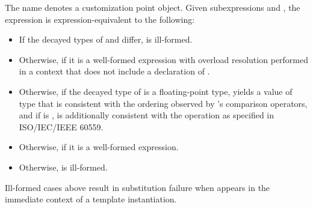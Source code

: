 %
\pnum
The name  denotes
a customization point object.
Given subexpressions  and ,
the expression 
is expression-equivalent to the following:
\begin{itemize}
\item
  If the decayed types of  and  differ,
   is ill-formed.
\item
  Otherwise, 
  if it is a well-formed expression
  with overload resolution performed in a context
  that does not include a declaration of .
\item
  Otherwise, if the decayed type  of  is
  a floating-point type,
  yields a value of type 
  that is consistent with the ordering
  observed by 's comparison operators, and
  if  is ,
  is additionally consistent with the  operation
  as specified in ISO/IEC/IEEE 60559.
\item
  Otherwise, 
  if it is a well-formed expression.
\item
  Otherwise,  is ill-formed.
\end{itemize}

\begin{note}
Ill-formed cases above result in substitution failure
when  appears in the immediate context
of a template instantiation.
\end{note}


